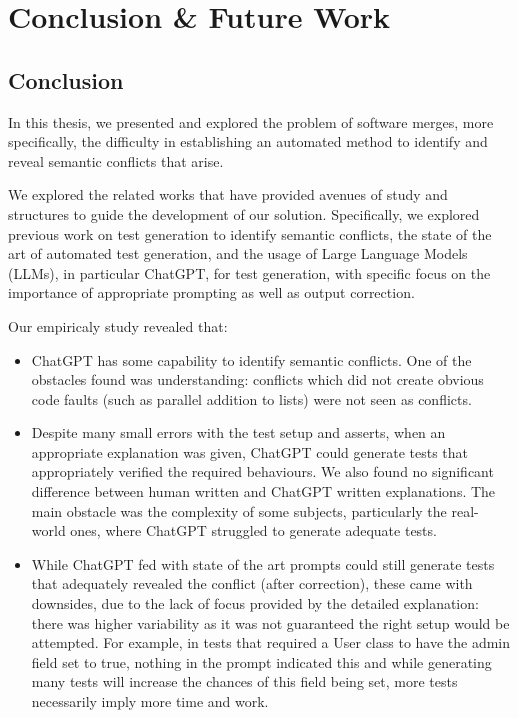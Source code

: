 \chapter{Conclusion \& Future Work}\label{chap:conclusion}

\section{Conclusion}

In this thesis, we presented and explored the problem of software merges, more specifically, the difficulty in establishing an automated method to identify and reveal semantic conflicts that arise.

We explored the related works that have provided avenues of study and structures to guide the development of our solution. Specifically, we explored previous work on test generation to identify semantic conflicts, the state of the art of automated test generation, and the usage of Large Language Models (LLMs), in particular ChatGPT, for test generation, with specific focus on the importance of appropriate prompting as well as output correction.

Our empiricaly study revealed that:
%
\begin{itemize}
  \item %
  ChatGPT has some capability to identify semantic conflicts. One of the obstacles found was understanding:
conflicts which did not create obvious code faults (such as parallel addition to lists) were not seen as conflicts. 

  \item %
  Despite many small errors with the test setup and asserts, when an appropriate explanation was given, ChatGPT could generate
tests that appropriately verified the required behaviours. We also found no significant difference between human written and ChatGPT written explanations. The main obstacle
was the complexity of some subjects, particularly the real-world ones, where ChatGPT struggled to generate adequate tests.

  \item %
  While ChatGPT fed with state of the art prompts could still generate tests that adequately revealed the conflict (after correction),
these came with downsides, due to the lack of focus provided by the detailed explanation: there was higher variability as it was not guaranteed the right setup would be attempted.
For example, in tests that required a User class to have the admin field set to true, nothing in the prompt indicated this and while generating many tests will increase the chances
of this field being set, more tests necessarily imply more time and work.
\end{itemize}

